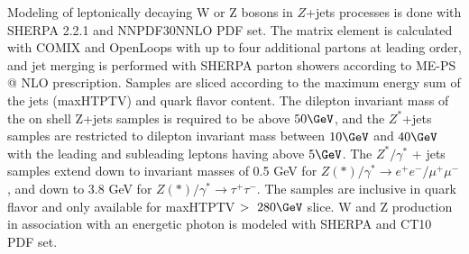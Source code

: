  \iffalse

 \begin{itemize}
 \item Detector simulation done with GEANT4.  GEANT4 models the ATLAS detector geometry, material interactions, and magnetic field potentials. 
 \item Pileup is modeled \textcolor{red}{how is it modeled}  
 \item \textcolor{blue}{Monte Carlo processed by sub-detector specific digitization algorithms, which translate the particle signatures in the detector into raw byte-stream data of the form that comes from the ATLAS detector.  Finally, fully simulated RDOs are reconstructed with release ?? of the ATLAS	 Athena reconstruction software, just like when processing real data.}
 \item \textcolor{red}{Do I want to make a schematic that illustrates the process of producing ATLAS MC simulation?}
 \end{itemize}
 \fi
 
 Modeling of leptonically decaying W or Z bosons in $Z$+jets processes is done with SHERPA 2.2.1 and NNPDF30NNLO PDF set.  The matrix element is calculated with COMIX \cite{comix} and OpenLoops \cite{loop} with up to four additional partons at leading order, and jet merging is performed with SHERPA parton showers according to ME-PS @ NLO prescription.  Samples are sliced according to the maximum energy sum of the jets (maxHTPTV) and quark flavor content.  The dilepton invariant mass of the on shell Z+jets samples is required to be above $50\GeV$, and the $Z^*$+jets samples are restricted to dilepton invariant mass between $10\GeV$ and $40\GeV$ with the leading and subleading leptons having \pt above $5\GeV$.  The $Z^*/\gamma^*$ + jets samples extend down to invariant masses of 0.5 GeV for $Z{(*)}/\gamma^* \rightarrow e^+e^-/\mu^+\mu^-$, and down to 3.8 GeV for $Z{(*)}/\gamma^* \rightarrow \tau^+\tau^-$.  The samples are inclusive in quark flavor and only available for maxHTPTV $>~280\GeV$ slice.  W and Z production in association with an energetic photon is modeled with SHERPA and CT10 PDF set. %
 
